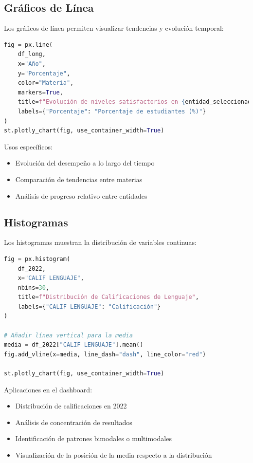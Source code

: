 \subsection{Gráficos de Línea}
Los gráficos de línea permiten visualizar tendencias y evolución temporal:

\begin{lstlisting}[language=Python, caption=Implementación de gráfico de línea]
fig = px.line(
    df_long,
    x="Año",
    y="Porcentaje",
    color="Materia",
    markers=True,
    title=f"Evolución de niveles satisfactorios en {entidad_seleccionada} (2015-2017)",
    labels={"Porcentaje": "Porcentaje de estudiantes (%)"}
)
st.plotly_chart(fig, use_container_width=True)
\end{lstlisting}

Usos específicos:
\begin{itemize}
    \item Evolución del desempeño a lo largo del tiempo
    \item Comparación de tendencias entre materias
    \item Análisis de progreso relativo entre entidades
\end{itemize}

\subsection{Histogramas}
Los histogramas muestran la distribución de variables continuas:

\begin{lstlisting}[language=Python, caption=Implementación de histogramas]
fig = px.histogram(
    df_2022,
    x="CALIF LENGUAJE",
    nbins=30,
    title=f"Distribución de Calificaciones de Lenguaje",
    labels={"CALIF LENGUAJE": "Calificación"}
)

# Añadir línea vertical para la media
media = df_2022["CALIF LENGUAJE"].mean()
fig.add_vline(x=media, line_dash="dash", line_color="red")

st.plotly_chart(fig, use_container_width=True)
\end{lstlisting}

Aplicaciones en el dashboard:
\begin{itemize}
    \item Distribución de calificaciones en 2022
    \item Análisis de concentración de resultados
    \item Identificación de patrones bimodales o multimodales
    \item Visualización de la posición de la media respecto a la distribución
\end{itemize}

